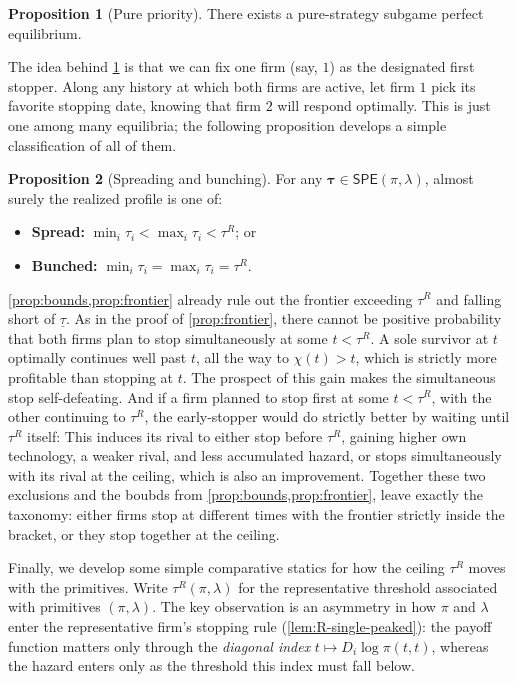 \documentclass[12pt,reqno]{article}
\newcommand{\SPE}{\ensuremath{\mathsf{SPE}}}
\theoremstyle{definition} \newtheorem{example}{Example}
\theoremstyle{definition} \newtheorem{condition}{Condition}
\theoremstyle{definition} \newtheorem{corollary}{Corollary}
\theoremstyle{definition} \newtheorem{claim}{Claim}
\theoremstyle{definition} \newtheorem{definition}{Definition}
\theoremstyle{definition} \newtheorem{conjecture}{Conjecture}
\theoremstyle{definition} \newtheorem{Lemma}{Lemma}
\theoremstyle{definition} \newtheorem{lemma}{Lemma}
\theoremstyle{plain} \newtheorem{theorem}{Theorem}
\theoremstyle{definition} \newtheorem{assumption}{Assumption}
\theoremstyle{definition} \newtheorem*{assumptionnonumber}{Assumption}
\theoremstyle{definition} \newtheorem*{theoremNoNumber}{Proposition}
\theoremstyle{definition}
\theoremstyle{definition}\newtheorem{proposition}{Proposition}
\theoremstyle{definition} \newtheorem{result}{Result}
\theoremstyle{definition} \newtheorem*{definitionNoNumber}{Definition}
\theoremstyle{definition} \newtheorem{Definition}{Definition}
\theoremstyle{definition} \newtheorem*{DefinitionNoNumber}{Definition}
\theoremstyle{definition} \newtheorem*{fact}{Fact}
\theoremstyle{definition} \newtheorem*{property}{Property}
\theoremstyle{definition} \newtheorem{remark}{Remark}
\begin{document}
 

\begin{proposition}[Pure priority]\label{prop:pure-priority}
    There exists a pure-strategy subgame perfect equilibrium.
\end{proposition}

The idea behind \cref{prop:pure-priority} is that we can fix one firm (say, $1$) as the designated first stopper. Along any history at which both firms are active, let firm $1$ pick its favorite stopping date, knowing that firm $2$ will respond optimally. This is just one among many equilibria; the following proposition develops a simple classification of all of them.

\begin{proposition}[Spreading and bunching]\label{prop:taxonomy}
For any $\bm\tau\in\SPE(\pi,\lambda)$, almost surely the realized profile is one of:
\begin{itemize}
  \item[(i)] \textbf{Spread:} $\min_i\tau_i<\max_i\tau_i<\tau^R$; or 
  \item[(ii)] \textbf{Bunched:} $\min_i\tau_i = \max_i\tau_i = \tau^R$.
\end{itemize}
\end{proposition}

\cref{prop:bounds,prop:frontier} already rule out the frontier exceeding
$\tau^R$ and falling short of $\underline\tau$. As in the proof of \cref{prop:frontier}, there cannot be positive probability that both firms plan
to stop simultaneously at some $t<\tau^R$.  A
sole survivor at $t$ optimally continues well past $t$, all the way to $\chi(t)>t$, which is strictly more profitable than
stopping at $t$. The prospect of this gain makes the simultaneous stop
self-defeating. And if a  firm
planned to stop first at some $t<\tau^R$, with the other  continuing to $\tau^R$, the early-stopper would do strictly
better by waiting until $\tau^R$ itself: This induces
its rival to either stop before $\tau^R$, gaining higher own technology, a
weaker rival, and less accumulated hazard, or stops simultaneously with
its rival at the ceiling, which is also an improvement. 
Together these two exclusions and the boubds from
\cref{prop:bounds,prop:frontier}, leave exactly the taxonomy: either
firms stop at different times with the frontier strictly inside the
bracket, or they stop together at the ceiling.



Finally, we develop some simple comparative statics for how the ceiling $\tau^R$ moves with the primitives. Write $\tau^R(\pi,\lambda)$ for the representative threshold associated with primitives $(\pi,\lambda)$. The key observation is an asymmetry in how $\pi$ and $\lambda$ enter the representative firm's stopping rule (\cref{lem:R-single-peaked}): the payoff function matters only through the \emph{diagonal index} $t \mapsto D_i\log\pi(t,t)$, whereas the hazard enters only as the threshold this index must fall below.
\end{document}
